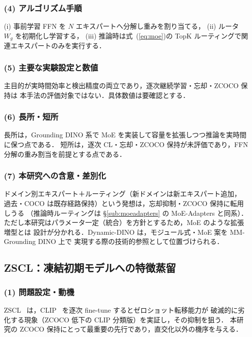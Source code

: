 \subsubsection*{(4) アルゴリズム手順}
(i) 事前学習 FFN を $N$ エキスパートへ分解し重みを割り当てる，
(ii) ルータ $W_g$ を初期化し学習する，
(iii) 推論時は式~(\ref{eq:moe})の TopK ルーティングで関連エキスパートのみを実行する．

\subsubsection*{(5) 主要な実験設定と数値}
主目的が実時間効率と検出精度の両立であり，逐次継続学習・忘却・ZCOCO 保持は
本手法の評価対象ではない．具体数値は要確認とする．

\subsubsection*{(6) 長所・短所}
長所は，Grounding DINO 系で MoE を実装して容量を拡張しつつ推論を実時間に保つ点である．
短所は，逐次 CL・忘却・ZCOCO 保持が未評価であり，FFN 分解の重み割当を前提とする点である．

\subsubsection*{(7) 本研究への含意・差別化}
ドメイン別エキスパート＋ルーティング（新ドメインは新エキスパート追加，
過去・COCO は既存経路保持）という発想は，忘却抑制・ZCOCO 保持に転用しうる
（推論時ルーティングは \S\ref{sub:moeadapters} の MoE-Adapters と同系）．
ただし本研究はパラメータ一定（統合）を方針とするため，MoE のような拡張増型とは
設計が分かれる．Dynamic-DINO は，モジュール式・MoE 案を MM-Grounding DINO 上で
実現する際の技術的参照として位置づけられる．

\subsection{ZSCL：凍結初期モデルへの特徴蒸留}
\label{sub:zscl}

\subsubsection*{(1) 問題設定・動機}
ZSCL~\cite{zscl} は，CLIP~\cite{clip} を逐次 fine-tune するとゼロショット転移能力が
破滅的に劣化する現象（ZCOCO 低下の CLIP 分類版）を実証し，その抑制を狙う．
本研究の ZCOCO 保持にとって最重要の先行であり，直交化以外の機序を与える．

